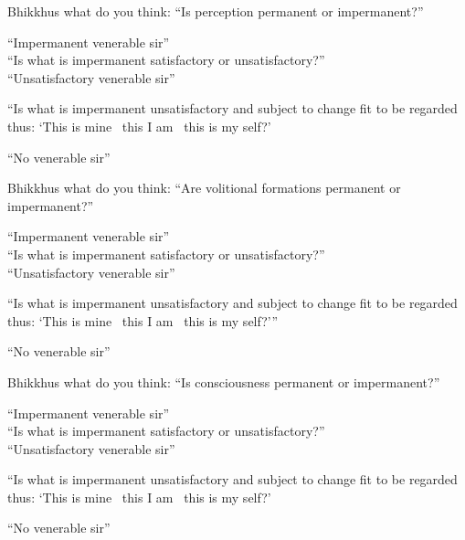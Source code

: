 \begin{english-only-nohang}
  \begin{english-only-hang}
    Bhikkhus what do you think: ``Is perception permanent or impermanent?''
  \end{english-only-hang}
  ``Impermanent venerable sir''\\
  ``Is what is impermanent satisfactory or unsatisfactory?''\\
  ``Unsatisfactory venerable sir''\\
  \begin{english-hangtogether}
    ``Is what is impermanent unsatisfactory and subject to change fit to be regarded thus: `This is mine \breathmark\ this I am \breathmark\ this is my self?'
  \end{english-hangtogether}
  ``No venerable sir''
\end{english-only-nohang}

\begin{english-only-nohang}
  \begin{english-only-hang}
    Bhikkhus what do you think: ``Are volitional formations permanent or impermanent?''
  \end{english-only-hang}
  ``Impermanent venerable sir''\\
  ``Is what is impermanent satisfactory or unsatisfactory?''\\
  ``Unsatisfactory venerable sir''
  \begin{english-hangtogether}
    ``Is what is impermanent unsatisfactory and subject to change fit to be regarded thus: `This is mine \breathmark\ this I am \breathmark\ this is my self?'''
  \end{english-hangtogether}
  ``No venerable sir''
\end{english-only-nohang}

\begin{english-only-nohang}
  \begin{english-only-hang}
    Bhikkhus what do you think: ``Is consciousness permanent or impermanent?''
  \end{english-only-hang}
  ``Impermanent venerable sir''\\
  ``Is what is impermanent satisfactory or unsatisfactory?''\\
  ``Unsatisfactory venerable sir''\\
  \begin{english-hangtogether}
    ``Is what is impermanent unsatisfactory and subject to change fit to be regarded thus: `This is mine \breathmark\ this I am \breathmark\ this is my self?'
  \end{english-hangtogether}
  ``No venerable sir''
\end{english-only-nohang}

